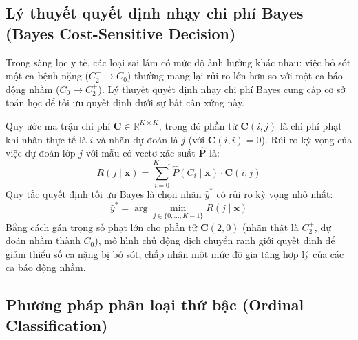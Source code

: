 \subsection{Lý thuyết quyết định nhạy chi phí Bayes (Bayes Cost-Sensitive Decision)}
\label{subsec:cost-sensitive-paradigm}

Trong sàng lọc y tế, các loại sai lầm có mức độ ảnh hưởng khác nhau: việc bỏ sót một ca bệnh nặng ($C_2^+ \to C_0$) thường mang lại rủi ro lớn hơn so với một ca báo động nhầm ($C_0 \to C_2^+$). Lý thuyết quyết định nhạy chi phí Bayes \cite{elkan2001foundations} cung cấp cơ sở toán học để tối ưu quyết định dưới sự bất cân xứng này.

Quy ước ma trận chi phí $\mathbf{C} \in \mathbb{R}^{K \times K}$, trong đó phần tử $\mathbf{C}(i, j)$ là chi phí phạt khi nhãn thực tế là $i$ và nhãn dự đoán là $j$ (với $\mathbf{C}(i, i) = 0$). Rủi ro kỳ vọng của việc dự đoán lớp $j$ với mẫu có vectơ xác suất $\hat{\mathbf{P}}$ là:
\begin{equation}
    R(j \mid \mathbf{x}) = \sum_{i=0}^{K-1} \hat{P}(C_i \mid \mathbf{x}) \cdot \mathbf{C}(i, j)
\end{equation}
Quy tắc quyết định tối ưu Bayes là chọn nhãn $\hat{y}^*$ có rủi ro kỳ vọng nhỏ nhất:
\begin{equation}
    \hat{y}^* = \arg\min_{j \in \{0, \dots, K-1\}} R(j \mid \mathbf{x})
\end{equation}
Bằng cách gán trọng số phạt lớn cho phần tử $\mathbf{C}(2, 0)$ (nhãn thật là $C_2^+$, dự đoán nhầm thành $C_0$), mô hình chủ động dịch chuyển ranh giới quyết định để giảm thiểu số ca nặng bị bỏ sót, chấp nhận một mức độ gia tăng hợp lý của các ca báo động nhầm.

\subsection{Phương pháp phân loại thứ bậc (Ordinal Classification)}
\label{subsec:ordinal-paradigm}

